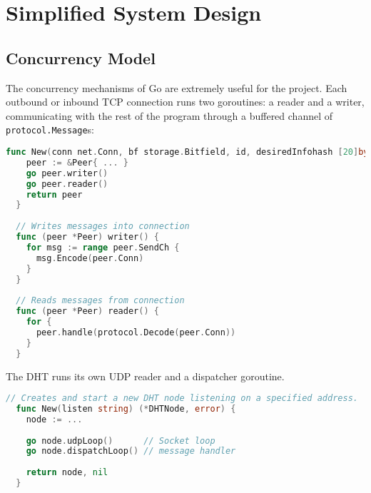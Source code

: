 \documentclass[11pt,a4paper]{article}
\begin{document}
\section{Simplified System Design}

\newpage
\subsection{Concurrency Model}
The concurrency mechanisms of Go are extremely useful for the project.
Each outbound or inbound TCP connection runs two goroutines: a reader and a writer,
communicating with the rest of the program through a buffered channel 
of \texttt{protocol.Message}s:
\begin{lstlisting}[language=go]
  func New(conn net.Conn, bf storage.Bitfield, id, desiredInfohash [20]byte) *Peer {
    peer := &Peer{ ... }
    go peer.writer()
    go peer.reader()
    return peer
  }
  
  // Writes messages into connection
  func (peer *Peer) writer() {
    for msg := range peer.SendCh {
      msg.Encode(peer.Conn)
    }
  }
  
  // Reads messages from connection
  func (peer *Peer) reader() {
    for {
      peer.handle(protocol.Decode(peer.Conn))
    }
  }
\end{lstlisting}


The DHT runs its own UDP reader and a dispatcher goroutine.
\begin{lstlisting}[language=go]
  // Creates and start a new DHT node listening on a specified address.
  func New(listen string) (*DHTNode, error) {
    node := ...
    
    go node.udpLoop()      // Socket loop
    go node.dispatchLoop() // message handler
  
    return node, nil
  }  
  
\end{lstlisting}
\end{document}
